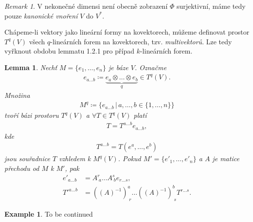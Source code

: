 \documentclass[a4paper,11pt]{article}
\theoremstyle{theorem}
\newtheorem{lemma}[theorem]{Lemma}
\theoremstyle{remark}
\newtheorem*{remark}{Remark}
\theoremstyle{definition}
\newtheorem*{example}{Example}
\begin{document}
	\begin{remark}
		V nekonečné dimensi není obecně zobrazení $\Phi$ surjektivní, máme tedy pouze \textit{kanonické vnoření} $V$ do $V^*$.
	\end{remark}
	
	Chápeme-li vektory jako lineární formy na kovektorech, můžeme definovat prostor $T^q(V)$ všech $q$-lineárních forem na kovektorech, tzv. \textit{multivektorů}. Lze tedy vyřknout obdobu lemmatu 1.2.1 pro případ $k$-lineárních forem.
	\begin{lemma}
		Nechť $M=\{e_1, \dots, e_n\}$ je báze $V$. Označme
		\begin{align*}
			e_{a \dots b} \coloneqq \underbrace{e_a \otimes \dots \otimes e_b}_q \in T^q(V).
		\end{align*}
		Množina
		\begin{align*}
			M^q \coloneqq \{ e_{a \dots b} \, | \, a, \dots, b \in \{1,\dots,n\} \}
		\end{align*}
		tvoří bázi prostoru $T^q(V)$ a $\forall T \in T^q(V)$ platí
		\begin{align*}
			T = T^{a \dots b} e_{a \dots b},
		\end{align*}
		kde
		\begin{align*}
			T^{a \dots b} = T(e^a, \dots, e^b)
		\end{align*}
		jsou souřadnice $T$ vzhledem k $M^q(V)$. Pokud $M' = \{e'_1, \dots, e'_n\}$ a $A$ je matice přechodu od $M$ k $M'$, pak
		\begin{align*}
			e'_{a \dots b} &= A^r_{\; a} \dots A^s_{\; b} e_{r \dots s},
			\\
			T'^{a \dots b} &= ((A)^{-1})^a_{\; r} \dots ((A)^{-1})^b_{\; s} T^{r \dots s}.
		\end{align*}
	\end{lemma}
	
	\begin{example}
		To be continued
	\end{example}
	
	
	
\end{document}
